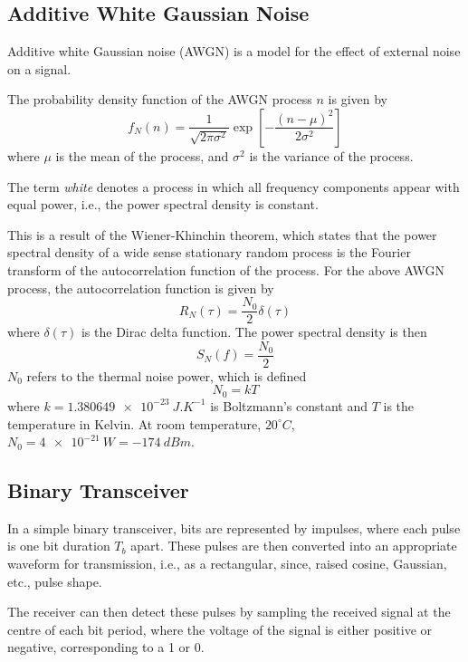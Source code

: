 \documentclass{article}
\begin{document}
\subsection{Additive White Gaussian Noise}
Additive white Gaussian noise (AWGN) is a model for the effect of
external noise on a signal.

The probability density function of the AWGN process \(n\) is given by
\begin{equation*}
    f_N\left( n \right) = \frac{1}{\sqrt{2\pi \sigma^2}} \exp{\left[ -\frac{\left( n - \mu \right)^2}{2\sigma^2} \right]}
\end{equation*}
where \(\mu\) is the mean of the process, and \(\sigma^2\) is the
variance of the process.

The term \textit{white} denotes a process in which all frequency
components appear with equal power, i.e., the power spectral density is
constant.

This is a result of the Wiener-Khinchin theorem, which states that the
power spectral density of a wide sense stationary random process is the
Fourier transform of the autocorrelation function of the process. For
the above AWGN process, the autocorrelation function is given by
\begin{equation*}
    R_N\left( \tau \right) = \frac{N_0}{2} \delta\left( \tau \right)
\end{equation*}
where \(\delta\left( \tau \right)\) is the Dirac delta function. The
power spectral density is then
\begin{equation*}
    S_N\left( f \right) = \frac{N_0}{2}
\end{equation*}
\(N_0\) refers to the thermal noise power, which is defined
\begin{equation*}
    N_0 = k T
\end{equation*}
where \(k = \qty{1.380649e-23}{J.K^{-1}}\) is Boltzmann's constant and
\(T\) is the temperature in Kelvin. At room temperature,
\(20^{\circ}C\), \(N_0 = \qty{4e-21}{W} = \qty{-174}{dBm}\).
\subsection{Binary Transceiver}
In a simple binary transceiver, bits are represented by impulses, where
each pulse is one bit duration \(T_b\) apart. These pulses are then
converted into an appropriate waveform for transmission, i.e., as a
rectangular, since, raised cosine, Gaussian, etc., pulse shape.

The receiver can then detect these pulses by sampling the received
signal at the centre of each bit period, where the voltage of the
signal is either positive or negative, corresponding to a 1 or 0.
\end{document}
